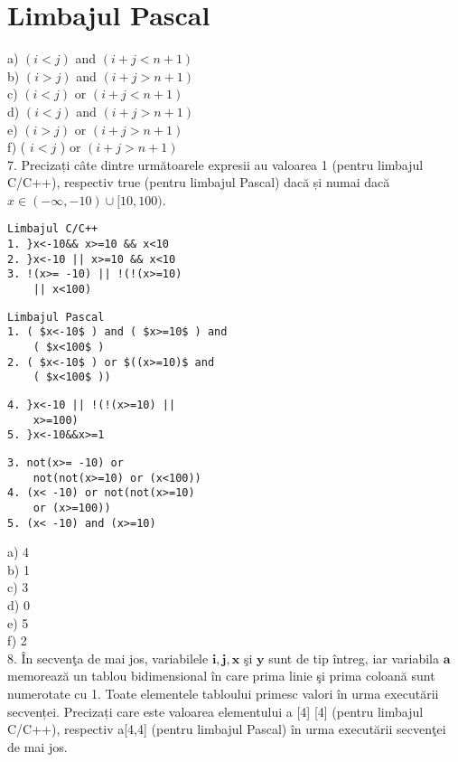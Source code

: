 \section*{Limbajul Pascal}
a) $(i<j)$ and $(i+j<n+1)$\\
b) $(i>j)$ and $(i+j>n+1)$\\
c) $(i<j)$ or $(i+j<n+1)$\\
d) $(i<j)$ and $(i+j>n+1)$\\
e) $(i>j)$ or $(i+j>n+1)$\\
f) ( $i<j$ ) or $(i+j>n+1)$\\
7. Precizați câte dintre următoarele expresii au valoarea 1 (pentru limbajul C/C++), respectiv true (pentru limbajul Pascal) dacă și numai dacă $x \in(-\infty,-10) \cup[10,100)$.

\begin{verbatim}
Limbajul C/C++
1. }x<-10&& x>=10 && x<10
2. }x<-10 || x>=10 && x<10
3. !(x>= -10) || !(!(x>=10)
    || x<100)
\end{verbatim}

\begin{verbatim}
Limbajul Pascal
1. ( $x<-10$ ) and ( $x>=10$ ) and
    ( $x<100$ )
2. ( $x<-10$ ) or $((x>=10)$ and
    ( $x<100$ ))
\end{verbatim}

\begin{verbatim}
4. }x<-10 || !(!(x>=10) ||
    x>=100)
5. }x<-10&&x>=1
\end{verbatim}

\begin{verbatim}
3. not(x>= -10) or
    not(not(x>=10) or (x<100))
4. (x< -10) or not(not(x>=10)
    or (x>=100))
5. (x< -10) and (x>=10)
\end{verbatim}

a) 4\\
b) 1\\
c) 3\\
d) 0\\
e) 5\\
f) 2\\
8. În secvenţa de mai jos, variabilele $\mathbf{i}, \mathbf{j}, \mathbf{x}$ şi $\mathbf{y}$ sunt de tip întreg, iar variabila $\mathbf{a}$ memorează un tablou bidimensional în care prima linie şi prima coloană sunt numerotate cu 1. Toate elementele tabloului primesc valori în urma executării secvenței. Precizați care este valoarea elementului a [4] [4] (pentru limbajul C/C++), respectiv a[4,4] (pentru limbajul Pascal) în urma executării secvenţei de mai jos.


